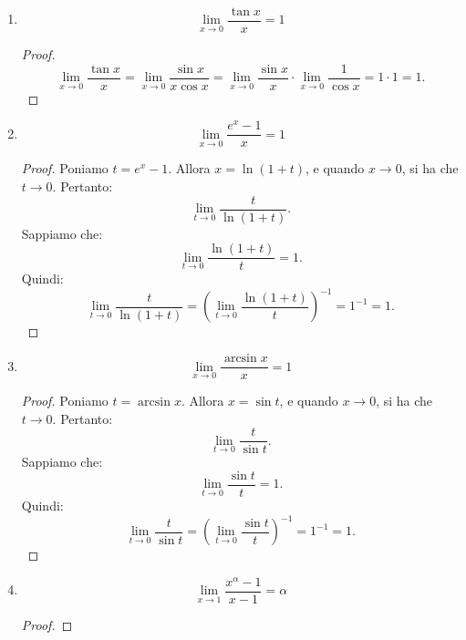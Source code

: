\documentclass{article}
\theoremstyle{plain}
\theoremstyle{definition}
\theoremstyle{remark}
\begin{document}
\begin{enumerate}
\begin{proof}
        Consideriamo ora il caso \( x \to 0^- \):
        \[
        \lim_{x\to0^-}\dfrac{\ln(1+x)}{x} = \lim_{t\to-\infty}\dfrac{\ln\left(1+\frac{1}{t}\right)}{\frac{1}{t}}.
        \]
        Questo si semplifica in:
        \[
        \lim_{t\to-\infty} t \ln\left(1+\dfrac{1}{t}\right).
        \]
        Applicando il limite, otteniamo:
        \[
        \lim_{t\to-\infty} \ln\left( \left(1+\dfrac{1}{t}\right)^t \right).
        \]
        Poiché \( \left(1 + \dfrac{1}{t}\right)^t \to e \) quando \( t \to -\infty \), abbiamo:
        \[
        \ln\left(\lim_{t\to-\infty}\left(1+\dfrac{1}{t}\right)^t\right) = \ln e = 1.
        \]
    
        Pertanto, in entrambi i casi, otteniamo:
        \[
        \lim_{x\to0}\dfrac{\ln(1+x)}{x}=1.
        \]
    \end{proof}
    \item \[\lim_{x\to0}\dfrac{\tan x}{x}=1\]
    \begin{proof}
        \[\lim_{x\to0}\dfrac{\tan x}{x}=\lim_{x\to0}\dfrac{\sin x}{x\cos x}=\lim_{x\to0}\dfrac{\sin x}{x}\cdot \lim_{x\to0}\dfrac{1}{\cos x}=1\cdot 1 = 1.\]
    \end{proof}
    \item \[\lim_{x\to0}\dfrac{e^x-1}{x}=1\]
    \begin{proof}
        Poniamo \( t = e^x - 1 \). Allora \( x = \ln(1 + t) \), e quando \( x \to 0 \), si ha che \( t \to 0 \). Pertanto:
        \[
        \lim_{t \to 0}\dfrac{t}{\ln(1+t)}.
        \]
        Sappiamo che:
        \[
        \lim_{t \to 0}\dfrac{\ln(1+t)}{t} = 1.
        \]
        Quindi:
        \[
        \lim_{t \to 0}\dfrac{t}{\ln(1+t)} = \left( \lim_{t \to 0}\dfrac{\ln(1+t)}{t} \right)^{-1} = 1^{-1} = 1.
        \]
    \end{proof}
    \item \[\lim_{x\to0}\dfrac{\arcsin x}{x}=1\]
    \begin{proof}
        Poniamo \( t = \arcsin x \). Allora \( x = \sin t \), e quando \( x \to 0 \), si ha che \( t \to 0 \). Pertanto:
        \[
        \lim_{t \to 0}\dfrac{t}{\sin t}.
        \]
        Sappiamo che:
        \[
        \lim_{t \to 0}\dfrac{\sin t}{t} = 1.
        \]
        Quindi:
        \[
        \lim_{t \to 0}\dfrac{t}{\sin t} = \left( \lim_{t \to 0}\dfrac{\sin t}{t} \right)^{-1} = 1^{-1} = 1.
        \]
    \end{proof}
    \item \[\lim_{x\to1}\dfrac{x^\alpha-1}{x-1}=\alpha\]
    \begin{proof}

\end{proof}
\end{enumerate}
\end{document}
